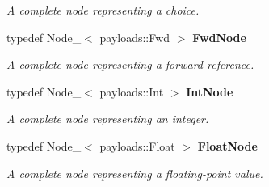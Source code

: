 \begin{CompactItemize}
\begin{CompactList}\small\item\em A complete node representing a choice. \item\end{CompactList}\item 
typedef Node\_\-$<$ payloads::Fwd $>$ {\bf Fwd\-Node}
\begin{CompactList}\small\item\em A complete node representing a forward reference. \item\end{CompactList}\item 
typedef Node\_\-$<$ payloads::Int $>$ {\bf Int\-Node}\label{namespacesprite_a33}

\begin{CompactList}\small\item\em A complete node representing an integer. \item\end{CompactList}\item 
typedef Node\_\-$<$ payloads::Float $>$ {\bf Float\-Node}\label{namespacesprite_a34}

\begin{CompactList}\small\item\em A complete node representing a floating-point value. \item\end{CompactList}\end{CompactItemize}
